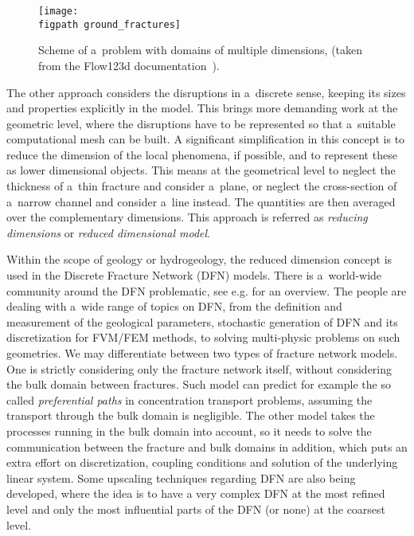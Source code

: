 \begin{figure}[!ht]
\centering
\texttt{[image: \\figpath ground\_fractures]}
\caption[Reduced dimensional model scheme.]{
    Scheme of a~problem with domains of multiple dimensions, (taken from the Flow123d documentation~\cite{flow123d_doc_2018}).}
\label{fig:multi-dim}
\end{figure}

% 

The other approach considers the disruptions in a~discrete sense, keeping its sizes and properties explicitly in the model.
This brings more demanding work at the geometric level, where the disruptions have to be represented so that a~suitable computational mesh can be built.
A significant simplification in this concept is to reduce the dimension of the local phenomena, if possible,
and to represent these as lower dimensional objects. This means at the geometrical level to neglect the thickness of a~thin fracture and consider a~plane, or
neglect the cross-section of a~narrow channel and consider a~line instead. The quantities are then averaged over the complementary dimensions.
This approach is referred as \emph{reducing dimensions} or \emph{reduced dimensional model}.

Within the scope of geology or hydrogeology, the reduced dimension concept is used in the Discrete Fracture Network (DFN) models.
There is a~world-wide community around the DFN problematic, see e.g. \cite{jing_fundamentals_dfn_2007, lei_use_dfn_2017} for an overview.
The people are dealing with a~wide range of topics on DFN,
from the definition and measurement of the geological parameters, stochastic generation of DFN and its discretization for FVM/FEM methods,
to solving multi-physic problems on such geometries. We may differentiate between two types of fracture network models. One is strictly considering only
the fracture network itself, without considering the bulk domain between fractures. Such model can predict for example the so called \emph{preferential paths}
in concentration transport problems, assuming the transport through the bulk domain is negligible. The other model takes the processes running in the bulk domain
into account, so it needs to solve the communication between the fracture and bulk domains in addition, which puts an extra effort on discretization,
coupling conditions and solution of the underlying linear system.
Some upscaling techniques regarding DFN are also being developed, where the idea is to have a very complex DFN at the most refined level and only the most influential
parts of the DFN (or none) at the coarsest level.

